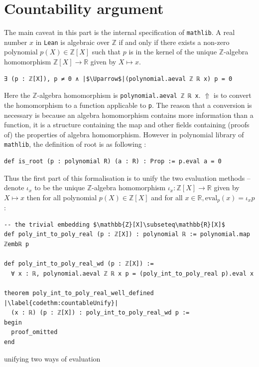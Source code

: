 \documentclass{report}
\theoremstyle{definition}
\newenvironment{code}{\captionsetup{type=listing}}{}
\begin{document}
\section{Countability argument}\label{fmlsn:count}
The main caveat in this part is the internal specification of {\tt \small mathlib}. 
A real number $x$ in {\tt \small Lean} is algebraic over $\mathbb Z$ if and only if there exists a non-zero polynomial $p(X)\in\mathbb Z[X]$ such that $p$ is in the kernel of the unique $\mathbb Z$-algebra homomorphism $\mathbb Z[X]\to\mathbb R$ given by $X\mapsto x$.
\begin{verbatim}
∃ (p : ℤ[X]), p ≠ 0 ∧ |$\Uparrow$|(polynomial.aeval ℤ ℝ x) p = 0
\end{verbatim}
Here the $\mathbb Z$-algebra homomorphism is {\tt \small polynomial.aeval ℤ ℝ x}. $\Uparrow$ is to convert the homomorphism to a function applicable to {\tt \small p}. The reason that a conversion is necessary is because an algebra homomorphism contains more information than a function, it is a structure containing the map and other fields containing (proofs of) the properties of algebra homomorphism.
However in polynomial library of {\tt \small mathlib}, the definition of root is as following :

\begin{verbatim}
def is_root (p : polynomial R) (a : R) : Prop := p.eval a = 0
\end{verbatim}

Thus the first part of this formalisation is to unify the two evaluation methods -- denote $\iota_x$ to be the unique $\mathbb Z$-algebra homomorphism $\iota_x : \mathbb Z[X]\to\mathbb R$ given by $X\mapsto x$ then for all polynomial $p(X)\in\mathbb Z[X]$ and for all $x\in\mathbb R,\mathrm{eval}_p(x) = \iota_x p$:

\begin{code}
\begin{verbatim}
-- the trivial embedding $\mathbb{Z}[X]\subseteq\mathbb{R}[X]$
def poly_int_to_poly_real (p : ℤ[X]) : polynomial ℝ := polynomial.map ℤembℝ p
    
def poly_int_to_poly_real_wd (p : ℤ[X]) := 
  ∀ x : ℝ, polynomial.aeval ℤ ℝ x p = (poly_int_to_poly_real p).eval x
    
theorem poly_int_to_poly_real_well_defined |\label{codethm:countableUnify}|
  (x : ℝ) (p : ℤ[X]) : poly_int_to_poly_real_wd p :=
begin
  proof_omitted
end
\end{verbatim}
\caption{unifying two ways of evaluation}
\label{code:countableUnify}
\end{code}
\end{document}

